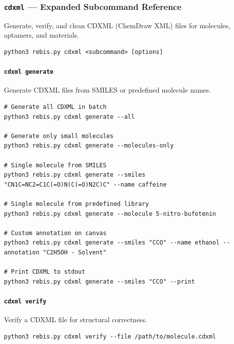 \documentclass[12pt,a4paper]{article}
\begin{document}
\hypertarget{cdxml-expanded-subcommand-reference}{%
\subsubsection{\texorpdfstring{\texttt{cdxml} --- Expanded Subcommand
Reference}{cdxml --- Expanded Subcommand Reference}}\label{cdxml-expanded-subcommand-reference}}

Generate, verify, and clean CDXML (ChemDraw XML) files for molecules,
aptamers, and materials.

\begin{verbatim}
python3 rebis.py cdxml <subcommand> [options]
\end{verbatim}

\hypertarget{cdxml-generate}{%
\paragraph{\texorpdfstring{\texttt{cdxml\ generate}}{cdxml generate}}\label{cdxml-generate}}

Generate CDXML files from SMILES or predefined molecule names.

\begin{verbatim}
# Generate all CDXML in batch
python3 rebis.py cdxml generate --all

# Generate only small molecules
python3 rebis.py cdxml generate --molecules-only

# Single molecule from SMILES
python3 rebis.py cdxml generate --smiles "CN1C=NC2=C1C(=O)N(C(=O)N2C)C" --name caffeine

# Single molecule from predefined library
python3 rebis.py cdxml generate --molecule 5-nitro-bufotenin

# Custom annotation on canvas
python3 rebis.py cdxml generate --smiles "CCO" --name ethanol --annotation "C2H5OH - Solvent"

# Print CDXML to stdout
python3 rebis.py cdxml generate --smiles "CCO" --print
\end{verbatim}

\hypertarget{cdxml-verify}{%
\paragraph{\texorpdfstring{\texttt{cdxml\ verify}}{cdxml verify}}\label{cdxml-verify}}

Verify a CDXML file for structural correctness.

\begin{verbatim}
python3 rebis.py cdxml verify --file /path/to/molecule.cdxml
\end{verbatim}
\end{document}
